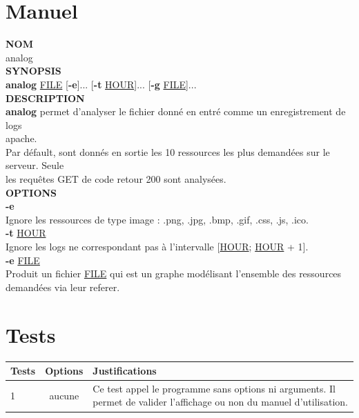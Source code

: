 \documentclass[a4paper]{article}
\begin{document}
\begin{appendix}
\section{Manuel}\noindent
\noindent
\textbf{\color{BurntOrange}NOM}\\
\indent \indent analog\\
\newline
\textbf{\color{BurntOrange}SYNOPSIS}\\
\indent \indent \textbf{\color{BurntOrange}analog} {\color{OliveGreen}\underline{FILE}} [\textbf{\color{BurntOrange}-e}]... [\textbf{\color{BurntOrange}-t} {\color{OliveGreen}\underline{HOUR}}]... [\textbf{\color{BurntOrange}-g} {\color{OliveGreen}\underline{FILE}}]...\\
\newline
\textbf{\color{BurntOrange}DESCRIPTION}\\
\indent \indent \textbf{\color{BurntOrange}analog} permet d'analyser le fichier donné en entré comme un enregistrement de logs\\
\indent \indent apache.\\
\indent \indent Par défault, sont donnés en sortie les 10 ressources les plus demandées sur le serveur. Seule\\
\indent \indent les requêtes GET de code retour 200 sont analysées.\\
\newline
\textbf{\color{BurntOrange}OPTIONS}\\
\indent \indent \textbf{\color{BurntOrange}-e} \\
\indent \indent \indent \indent Ignore les ressources de type image : .png, .jpg, .bmp, .gif, .css, .js, .ico.\\
\newline
\indent \indent \textbf{\color{BurntOrange}-t} {\color{OliveGreen}\underline{HOUR}}\\
\indent \indent \indent \indent Ignore les logs ne correspondant pas à l'intervalle [{\color{OliveGreen}\underline{HOUR}}; {\color{OliveGreen}\underline{HOUR}} + 1].\\
\newline
\indent \indent \textbf{\color{BurntOrange}-e} {\color{OliveGreen}\underline{FILE}}\\
\indent \indent \indent \indent Produit un fichier {\color{OliveGreen}\underline{FILE}} qui est un graphe modélisant l'ensemble des ressources\\
\indent \indent \indent \indent demandées via leur referer.\\
\newline
\clearpage

\section{Tests}\noindent
\begin{tabular}{|l|c|m{10cm}|}
\hline
\bf Tests & \bf Options & \bf Justifications\\
\hline
1		 & aucune 	    & Ce test appel le programme sans options ni arguments. Il permet de valider l'affichage ou non du manuel d'utilisation.\\
\hline


\end{tabular}
\end{appendix}
\end{document}
